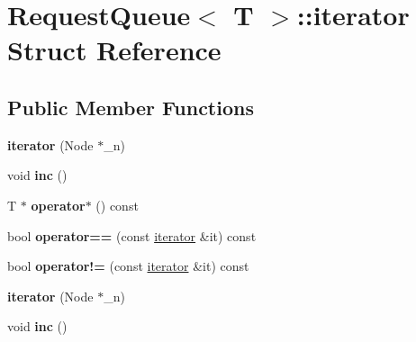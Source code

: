 \hypertarget{structRequestQueue_1_1iterator}{\section{Request\-Queue$<$ T $>$\-:\-:iterator Struct Reference}
\label{structRequestQueue_1_1iterator}
}
\subsection*{Public Member Functions}
\begin{DoxyCompactItemize}
\item 
\hypertarget{structRequestQueue_1_1iterator_a81c02458f73e4abcc164721bc7bf9ec8}{{\bfseries iterator} (Node $\ast$\-\_\-n)}\label{structRequestQueue_1_1iterator_a81c02458f73e4abcc164721bc7bf9ec8}

\item 
\hypertarget{structRequestQueue_1_1iterator_a4410e25d6c56a96f4f2c88c6f526f59c}{void {\bfseries inc} ()}\label{structRequestQueue_1_1iterator_a4410e25d6c56a96f4f2c88c6f526f59c}

\item 
\hypertarget{structRequestQueue_1_1iterator_a4a30ee1943a2ed409656b28943b5b9d6}{T $\ast$ {\bfseries operator$\ast$} () const }\label{structRequestQueue_1_1iterator_a4a30ee1943a2ed409656b28943b5b9d6}

\item 
\hypertarget{structRequestQueue_1_1iterator_a9732619b2d13264887cfc4762f4a2ab2}{bool {\bfseries operator==} (const \hyperlink{structRequestQueue_1_1iterator}{iterator} \&it) const }\label{structRequestQueue_1_1iterator_a9732619b2d13264887cfc4762f4a2ab2}

\item 
\hypertarget{structRequestQueue_1_1iterator_af4f57acd1a7ebdc7f3a896adc726b27e}{bool {\bfseries operator!=} (const \hyperlink{structRequestQueue_1_1iterator}{iterator} \&it) const }\label{structRequestQueue_1_1iterator_af4f57acd1a7ebdc7f3a896adc726b27e}

\item 
\hypertarget{structRequestQueue_1_1iterator_a81c02458f73e4abcc164721bc7bf9ec8}{{\bfseries iterator} (Node $\ast$\-\_\-n)}\label{structRequestQueue_1_1iterator_a81c02458f73e4abcc164721bc7bf9ec8}

\item 
\hypertarget{structRequestQueue_1_1iterator_a4410e25d6c56a96f4f2c88c6f526f59c}{void {\bfseries inc} ()}\label{structRequestQueue_1_1iterator_a4410e25d6c56a96f4f2c88c6f526f59c}


\end{DoxyCompactItemize}
